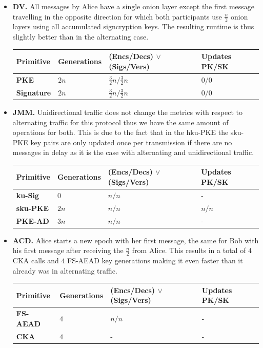 \documentclass[11pt,a4paper,twoside,openright,bibliography=totoc]{scrbook}
\begin{document}
\begin{itemize}
\item \textbf{DV.} All messages by Alice have a single onion layer except
  the first message travelling in the opposite direction for which both
  participants use $\frac{n}{2}$ onion
  layers using all accumulated signcryption keys. The resulting runtime
  is thus slightly better than in the alternating case.
  \begin{center}
    \begin{tabular}{ | l | l | l | l |}
    \hline
    Primitive & Generations & (Encs/Decs) $\vee$ (Sigs/Vers) & Updates PK/SK \\ \hline
    \textbf{PKE} & $2n$ & $\frac{3}{2}n/\frac{3}{2}n$ & $0/0$ \\ \hline
    \textbf{Signature} & $2n$ & $\frac{3}{2}n/\frac{3}{2}n$ & $0/0$ \\  
    \hline
    \end{tabular}
  \end{center}
\item \textbf{JMM.} Unidirectional traffic does not change the metrics
  with respect to alternating traffic for this protocol thus we have the
  same amount of operations for both. This is due to the fact that in
  the hku-PKE the sku-PKE key pairs are only updated once per transmission
  if there are no messages in delay as it is the case with alternating
  and unidirectional traffic.
  \begin{center}
    \begin{tabular}{ | l | l | l | l |}
    \hline
    Primitive & Generations & (Encs/Decs) $\vee$ (Sigs/Vers) & Updates PK/SK \\ \hline
    \textbf{ku-Sig} & $0$ & $n/n$ & - \\ \hline
    \textbf{sku-PKE} & $2n$ & $n/n$ & $n/n$ \\ \hline
    \textbf{PKE-AD} & $3n$ & $n/n$ & - \\
    \hline
    \end{tabular}
  \end{center}
\item \textbf{ACD.} Alice starts a new epoch with her first message, the
  same for Bob with his first message after receiving the $\frac{n}{2}$
  from Alice. This results in a total of $4$ CKA calls and $4$ FS-AEAD
  key generations making it even faster than it already was in alternating
  traffic.
  \begin{center}
    \begin{tabular}{ | l | l | l | l |}
    \hline
    Primitive & Generations & (Encs/Decs) $\vee$ (Sigs/Vers) & Updates PK/SK \\ \hline
    \textbf{FS-AEAD} & $4$ & $n/n$ & - \\ \hline
    \textbf{CKA} & $4$ & - & - \\  
    \hline
    \end{tabular}
  \end{center}
\end{itemize}
\end{document}
